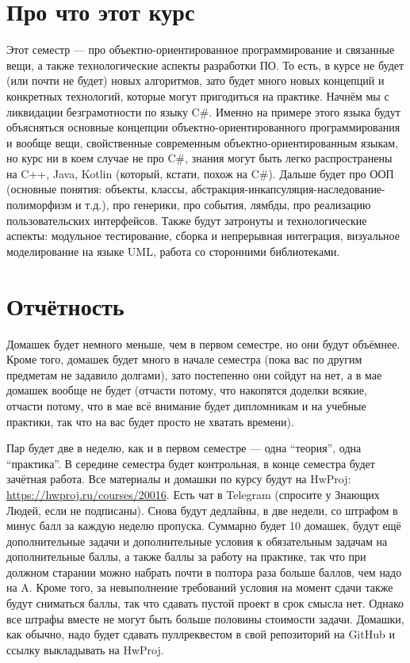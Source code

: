 \documentclass{../../text-style}
\begin{document}
\maketitle
\thispagestyle{empty}

\section{Про что этот курс}

Этот семестр --- про объектно-ориентированное программирование и связанные вещи, а также технологические аспекты разработки ПО. То есть, в курсе не будет (или почти не будет) новых алгоритмов, зато будет много новых концепций и конкретных технологий, которые могут пригодиться на практике. Начнём мы с ликвидации безграмотности по языку C\#. Именно на примере этого языка будут объясняться основные концепции объектно-ориентированного программирования и вообще вещи, свойственные современным объектно-ориентированным языкам, но курс ни в коем случае не про C\#, знания могут быть легко распространены на C++, Java, Kotlin (который, кстати, похож на C\#). Дальше будет про ООП (основные понятия: объекты, классы, абстракция-инкапсуляция-наследование-полиморфизм и т.д.), про генерики, про события, лямбды, про реализацию пользовательских интерфейсов. Также будут затронуты и технологические аспекты: модульное тестирование, сборка и непрерывная интеграция, визуальное моделирование на языке UML, работа со сторонними библиотеками.

\section{Отчётность}

Домашек будет немного меньше, чем в первом семестре, но они будут объёмнее. Кроме того, домашек будет много в начале семестра (пока вас по другим предметам не задавило долгами), зато постепенно они сойдут на нет, а в мае домашек вообще не будет (отчасти потому, что накопятся доделки всякие, отчасти потому, что в мае всё внимание будет дипломникам и на учебные практики, так что на вас будет просто не хватать времени).

Пар будет две в неделю, как и в первом семестре --- одна \enquote{теория}, одна \enquote{практика}. В середине семестра будет контрольная, в конце семестра будет зачётная работа. Все материалы и домашки по курсу будут на HwProj: \url{https://hwproj.ru/courses/20016}. Есть чат в Telegram (спросите у Знающих Людей, если не подписаны). Снова будут дедлайны, в две недели, со штрафом в минус балл за каждую неделю пропуска. Суммарно будет 10 домашек, будут ещё дополнительные задачи и дополнительные условия к обязательным задачам на дополнительные баллы, а также баллы за работу на практике, так что при должном старании можно набрать почти в полтора раза больше баллов, чем надо на A. Кроме того, за невыполнение требований условия на момент сдачи также будут сниматься баллы, так что сдавать пустой проект в срок смысла нет. Однако все штрафы вместе не могут быть больше половины стоимости задачи. Домашки, как обычно, надо будет сдавать пуллреквестом в свой репозиторий на GitHub и ссылку выкладывать на HwProj.
\end{document}
